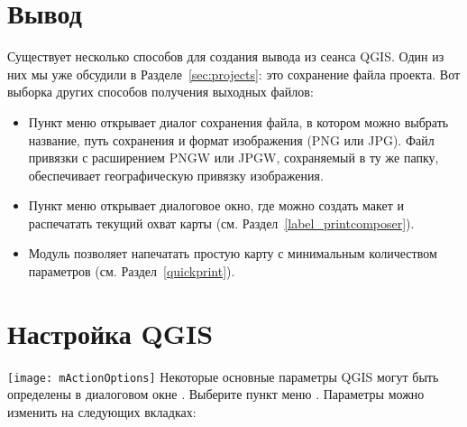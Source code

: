 \section{Вывод}\label{sec:output}

Существует несколько способов для создания вывода из сеанса QGIS. Один из
них мы уже обсудили в Разделе~\ref{sec:projects}: это сохранение файла
проекта. Вот выборка других способов получения выходных файлов:

\begin{itemize}
\item Пункт меню 
открывает диалог сохранения файла, в котором можно выбрать название, путь сохранения
и формат изображения (PNG или JPG). Файл привязки с расширением PNGW
или JPGW, сохраняемый в ту же папку, обеспечивает географическую привязку
изображения.
\item Пункт меню 
открывает диалоговое окно, где можно создать макет и распечатать текущий
охват карты (см. Раздел~\ref{label_printcomposer}).
\item Модуль  позволяет напечатать
простую карту с минимальным количеством параметров (см. Раздел~\ref{quickprint}).
\end{itemize}

\section{Настройка QGIS}\label{subsec:gui_options}

\texttt{[image: mActionOptions]} Некоторые основные
параметры QGIS могут быть определены в диалоговом окне .
Выберите пункт меню  \arrow
{}. Параметры можно изменить на
следующих вкладках:


